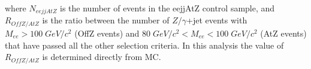 \documentclass{cmspaper}
\begin{document}
\begin{linenumbers}
where $N_{eejjAtZ}$ is the number of events in the eejjAtZ control sample, and 
$R_{OffZ/AtZ}$ is the ratio between the number of $Z/\gamma$+jet events 
with $M_{ee} > 100\; GeV/c^2$ (OffZ events) and $80\; GeV/c^2 < M_{ee} < 100\; GeV/c^2$ 
(AtZ events) that have passed all the other selection criteria.
In this analysis the value of $R_{OffZ/AtZ}$ is determined directly from MC.
%

\end{linenumbers}
\end{document}
